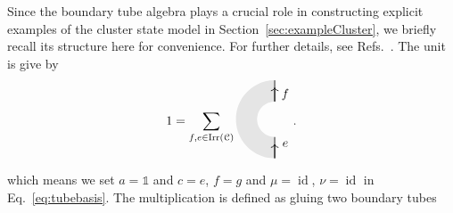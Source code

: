 \documentclass[a4paper,11pt]{article}
\theoremstyle{theorem}
\theoremstyle{remark}
\newcommand\eC           {\EuScript{C}}
\newcommand{\id}{\operatorname{id}}
\newcommand{\Irr}{\operatorname{Irr}}
\begin{document}
Since the boundary tube algebra plays a crucial role in constructing explicit examples of the cluster state model in Section~\ref{sec:exampleCluster}, we briefly recall its structure here for convenience. For further details, see Refs.~\cite{jia2024weakTube,jia2025weakhopftubealgebra}.
The unit is give by
\begin{equation}
1=\sum_{f,e\in \Irr(\eC)}
\begin{aligned}
    \begin{tikzpicture}
        \begin{scope}
            \fill[gray!20]
                (0,1.1) arc[start angle=90, end angle=270, radius=1.1] -- 
                (0,-0.5) arc[start angle=270, end angle=90, radius=0.5] -- cycle;
        \end{scope}
           \draw[line width=0.6pt,black,->] (0,0.5)--(0,0.9);
           \draw[line width=0.6pt,black] (0,0.5)--(0,1.1);
        \draw[line width=.6pt,black] (0,-0.5)--(0,-1.1);
        \draw[line width=0.6pt,black,->] (0,-1.1)--(0,-0.7);
        \node[line width=0.6pt, dashed, draw opacity=0.5] at (0.3,-0.7) {$e$};
        \node[line width=0.6pt, dashed, draw opacity=0.5] at (0.3,0.7) {$f$};
    \end{tikzpicture}
\end{aligned}.
\end{equation}
which means we set $a=\mathbb{1}$ and $c=e$, $f=g$ and $\mu=\id$, $\nu=\id$ in Eq.~\eqref{eq:tubebasis}.
The multiplication is defined as gluing two boundary tubes
\end{document}
